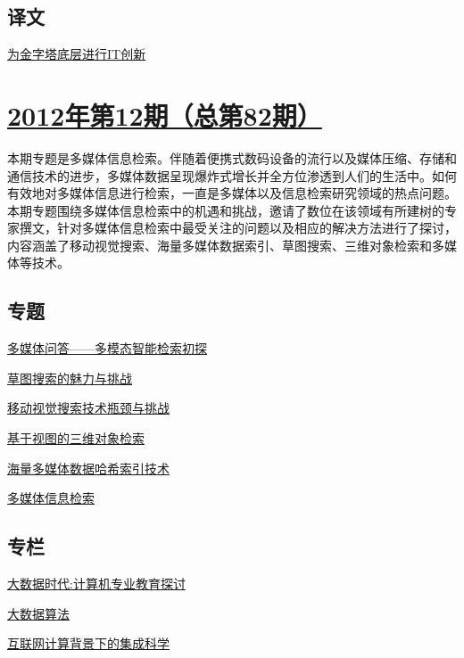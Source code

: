 \documentclass[a4paper]{article}
\begin{document}
\subsection{译文}
\href{http://history.ccf.org.cn/resources/1190201776262/2013/01/21/13.pdf}{为金字塔底层进行IT创新}


\section{\href{http://history.ccf.org.cn/sites/ccf/jsjtbbd.jsp?contentId=2711378931600}{\textbf{2012年第12期（总第82期）}}}
本期专题是多媒体信息检索。伴随着便携式数码设备的流行以及媒体压缩、存储和通信技术的进步，多媒体数据呈现爆炸式增长并全方位渗透到人们的生活中。如何有效地对多媒体信息进行检索，一直是多媒体以及信息检索研究领域的热点问题。本期专题围绕多媒体信息检索中的机遇和挑战，邀请了数位在该领域有所建树的专家撰文，针对多媒体信息检索中最受关注的问题以及相应的解决方法进行了探讨，内容涵盖了移动视觉搜索、海量多媒体数据索引、草图搜索、三维对象检索和多媒体等技术。
\subsection{专题}
\href{http://history.ccf.org.cn/resources/1190201776262/2012/12/17/6.pdf}{多媒体问答——多模态智能检索初探}

\href{http://history.ccf.org.cn/resources/1190201776262/2012/12/17/4.pdf}{草图搜索的魅力与挑战}

\href{http://history.ccf.org.cn/resources/1190201776262/2012/12/17/2.pdf}{移动视觉搜索技术瓶颈与挑战}

\href{http://history.ccf.org.cn/resources/1190201776262/2012/12/17/5.pdf}{基于视图的三维对象检索}

\href{http://history.ccf.org.cn/resources/1190201776262/2012/12/17/3.pdf}{海量多媒体数据哈希索引技术}

\href{http://history.ccf.org.cn/resources/1190201776262/2012/12/17/1.pdf}{多媒体信息检索}

\subsection{专栏}
\href{http://history.ccf.org.cn/resources/1190201776262/2012/12/17/9.pdf}{大数据时代:计算机专业教育探讨}

\href{http://history.ccf.org.cn/resources/1190201776262/2012/12/17/12.pdf}{大数据算法}

\href{http://history.ccf.org.cn/resources/1190201776262/2012/12/17/11.pdf}{互联网计算背景下的集成科学}
\end{document}
